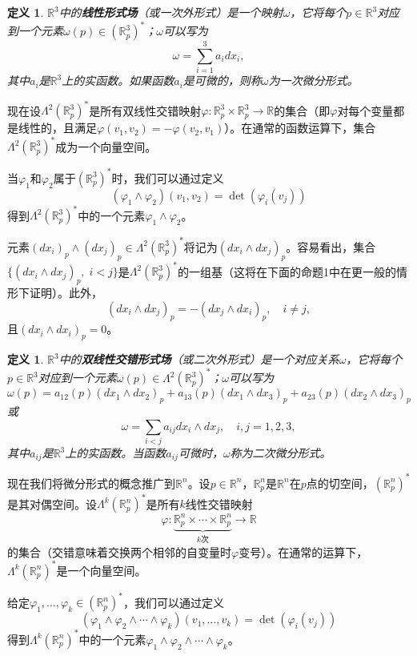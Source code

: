 \documentclass[12pt,a4paper]{ctexbook}
\newtheorem{definition}[theorem]{定义}
\begin{document}
\begin{definition}
$\mathbb{R}^3$中的\textbf{线性形式场}（或一次外形式）是一个映射$\omega$，它将每个$p\in\mathbb{R}^3$对应到一个元素$\omega(p)\in(\mathbb{R}_p^3)^*$；$\omega$可以写为
$$\omega = \sum_{i=1}^3 a_i dx_i,$$
其中$a_i$是$\mathbb{R}^3$上的实函数。如果函数$a_i$是可微的，则称$\omega$为一次微分形式。
\end{definition}

现在设$\Lambda^2(\mathbb{R}_p^3)^*$是所有双线性交错映射$\varphi:\mathbb{R}_p^3\times\mathbb{R}_p^3\to\mathbb{R}$的集合（即$\varphi$对每个变量都是线性的，且满足$\varphi(v_1,v_2)=-\varphi(v_2,v_1)$）。在通常的函数运算下，集合$\Lambda^2(\mathbb{R}_p^3)^*$成为一个向量空间。

当$\varphi_1$和$\varphi_2$属于$(\mathbb{R}_p^3)^*$时，我们可以通过定义
$$(\varphi_1\wedge\varphi_2)(v_1,v_2) = \det(\varphi_i(v_j))$$
得到$\Lambda^2(\mathbb{R}_p^3)^*$中的一个元素$\varphi_1\wedge\varphi_2$。

元素$(dx_i)_p\wedge(dx_j)_p\in\Lambda^2(\mathbb{R}_p^3)^*$将记为$(dx_i\wedge dx_j)_p$。容易看出，集合$\{(dx_i\wedge dx_j)_p,\;i<j\}$是$\Lambda^2(\mathbb{R}_p^3)^*$的一组基（这将在下面的命题1中在更一般的情形下证明）。此外，
$$(dx_i\wedge dx_j)_p = -(dx_j\wedge dx_i)_p,\quad i\neq j,$$
且$(dx_i\wedge dx_i)_p = 0$。

\begin{definition}
$\mathbb{R}^3$中的\textbf{双线性交错形式场}（或二次外形式）是一个对应关系$\omega$，它将每个$p\in\mathbb{R}^3$对应到一个元素$\omega(p)\in\Lambda^2(\mathbb{R}_p^3)^*$；$\omega$可以写为
$$\omega(p) = a_{12}(p)(dx_1\wedge dx_2)_p + a_{13}(p)(dx_1\wedge dx_3)_p + a_{23}(p)(dx_2\wedge dx_3)_p$$
或
$$\omega = \sum_{i<j} a_{ij} dx_i\wedge dx_j,\quad i,j=1,2,3,$$
其中$a_{ij}$是$\mathbb{R}^3$上的实函数。当函数$a_{ij}$可微时，$\omega$称为二次微分形式。
\end{definition}

现在我们将微分形式的概念推广到$\mathbb{R}^n$。设$p\in\mathbb{R}^n$，$\mathbb{R}_p^n$是$\mathbb{R}^n$在$p$点的切空间，$(\mathbb{R}_p^n)^*$是其对偶空间。设$\Lambda^k(\mathbb{R}_p^n)^*$是所有$k$线性交错映射
$$\varphi:\underbrace{\mathbb{R}_p^n\times\cdots\times\mathbb{R}_p^n}_{k\text{次}}\to\mathbb{R}$$
的集合（交错意味着交换两个相邻的自变量时$\varphi$变号）。在通常的运算下，$\Lambda^k(\mathbb{R}_p^n)^*$是一个向量空间。

给定$\varphi_1,\ldots,\varphi_k\in(\mathbb{R}_p^n)^*$，我们可以通过定义
$$(\varphi_1\wedge\varphi_2\wedge\cdots\wedge\varphi_k)(v_1,\ldots,v_k) = \det(\varphi_i(v_j))$$
得到$\Lambda^k(\mathbb{R}_p^n)^*$中的一个元素$\varphi_1\wedge\varphi_2\wedge\cdots\wedge\varphi_k$。
\end{document}
